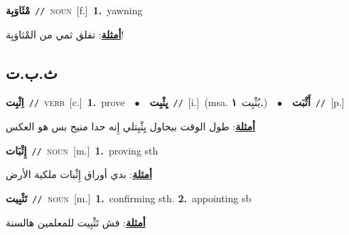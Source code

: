 \documentclass[10pt,a4paper,twoside]{article} %
\begin{document}
\begin{multicols}{2}
{\setlength\topsep{0pt}\textbf{\foreignlanguage{arabic}{مْثَاوَبِة}}\ {\color{gray}\texttt{//}\color{black}}\ \textsc{noun}\ [f.]\ \textbf{1.}~yawning\  \begin{flushright}\color{gray}\foreignlanguage{arabic}{\textbf{\underline{\foreignlanguage{arabic}{أمثلة}}}: تفلق ثمي من المْثاوَبِة!}\end{flushright}\color{black}} \vspace{2mm}

\vspace{-3mm}
\subsection*{\color{blue}\foreignlanguage{arabic}{ث.ب.ت}\color{blue}{}} 

{\setlength\topsep{0pt}\textbf{\foreignlanguage{arabic}{اِثْبِت}}\ {\color{gray}\texttt{//}\color{black}}\ \textsc{verb}\ [c.]\ \textbf{1.}~prove\ \ $\bullet$\ \ \setlength\topsep{0pt}\textbf{\foreignlanguage{arabic}{يِثْبِت}}\ {\color{gray}\texttt{//}\color{black}}\ [i.]\ \color{gray}(msa. \foreignlanguage{arabic}{يُثْبِت}~\foreignlanguage{arabic}{\textbf{١.}})\color{black}\ \ $\bullet$\ \ \setlength\topsep{0pt}\textbf{\foreignlanguage{arabic}{أَثْبَت}}\ {\color{gray}\texttt{//}\color{black}}\ [p.]\  \begin{flushright}\color{gray}\foreignlanguage{arabic}{\textbf{\underline{\foreignlanguage{arabic}{أمثلة}}}: طول الوقت بيحاول يِثْبِتلي إِنه حدا منيح بس هو العكس}\end{flushright}\color{black}} \vspace{2mm}

{\setlength\topsep{0pt}\textbf{\foreignlanguage{arabic}{إِثْبَات}}\ {\color{gray}\texttt{//}\color{black}}\ \textsc{noun}\ [m.]\ \textbf{1.}~proving sth\  \begin{flushright}\color{gray}\foreignlanguage{arabic}{\textbf{\underline{\foreignlanguage{arabic}{أمثلة}}}: بدي أوراق إِثْبات ملكية الأرض}\end{flushright}\color{black}} \vspace{2mm}

{\setlength\topsep{0pt}\textbf{\foreignlanguage{arabic}{تَثْبِيت}}\ {\color{gray}\texttt{//}\color{black}}\ \textsc{noun}\ [m.]\ \textbf{1.}~confirming sth.  \textbf{2.}~appointing sb\  \begin{flushright}\color{gray}\foreignlanguage{arabic}{\textbf{\underline{\foreignlanguage{arabic}{أمثلة}}}: فش تَثْبِيت للمعلمين هالسنة}\end{flushright}\color{black}} \vspace{2mm}


\end{multicols}
\end{document}
